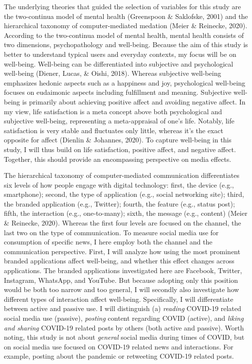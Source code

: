 \documentclass[
  english,
  man,mask,floatsintext]{apa6}
\begin{document}
The underlying theories that guided the selection of variables for this study are the two-continua model of mental health (Greenspoon \& Saklofske, 2001) and the hierarchical taxonomy of computer-mediated medation (Meier \& Reinecke, 2020).
According to the two-continua model of mental health, mental health consists of two dimensions, psychopathology and well-being.
Because the aim of this study is better to understand typical users and everyday contexts, my focus will be on well-being.
Well-being can be differentiated into subjective and psychological well-being (Diener, Lucas, \& Oishi, 2018).
Whereas subjective well-being emphasizes hedonic aspects such as a happiness and joy, psychological well-being focuses on eudaimonic aspects including fulfillment and meaning.
Subjective well-being is primarily about achieving positive affect and avoiding negative affect.
In my view, life satisfaction is a meta concept above both psychological and subjective well-being, representing a meta-appraisal of one's life.
Notably, life satisfaction is very stable and fluctuates only little, whereas it's the exact opposite for affect (Dienlin \& Johannes, 2020).
To capture well-being in this study, I will thus build on life satisfaction, positive affect, and negative affect.
Together, this should provide an encompassing perspective on media effects.

The hierarchical taxonomy of computer-mediated communication differentiates six levels of how people engage with digital technology:
first, the device (e.g., smartphone); second, the type of application (e.g., social networking site); third, the branded application (e.g., Twitter); fourth, the feature (e.g., status post); fifth, the interaction (e.g., one-to-many); sixth, the message (e.g., content) (Meier \& Reinecke, 2020).
Whereas the first four levels are focused on the channel, the last two on the type of communication.
To measure social media use for consumption of specific news, I here employ both the channel and the communication perspective.
First, I will analyze how using the most prominent branded applications affect well-being, and whether this effect changes across applications.
The branded applications investigated here are Facebook, Twitter, Instagram, WhatsApp, and YouTube.
But because adopting only this position would be both too narrow and too general, I will secondly also investigate how different types of interaction affect well-being.
Specifically, I will differentiate between active and passive use.
I will distinguish (a) \emph{reading} COVID-19 related social media use (passive), \emph{posting} content regarding COVID (active), and \emph{liking and sharing} COVID-19 related posts by others (both active and passive).
Worth noting, this study is not about \emph{general} social media during times of COVID, but on social media use focused on COVID-19 related news and interactions.
For example, posting about the pandemic or retweeting COVID-19 related posts.
\end{document}
